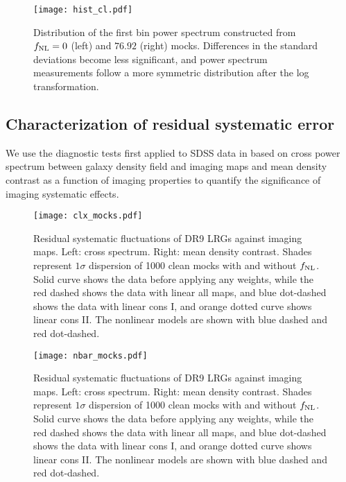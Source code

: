 \begin{figure}
\centering
\texttt{[image: hist\_cl.pdf]}
\caption{Distribution of the first bin power spectrum constructed from $f_{\rm NL}=0$ (left) and $76.92$ (right) mocks. Differences in the standard deviations become less significant, and power spectrum measurements follow a more symmetric distribution after the log transformation.}\label{fig:histcell}
\end{figure}


\subsection{Characterization of residual systematic error}
\label{ssec:characterization}
We use the diagnostic tests first applied to SDSS data in \cite{rezaie2021primordial} based on cross power spectrum between galaxy density field and imaging maps and mean density contrast as a function of imaging properties to quantify the significance of imaging systematic effects. 
\begin{figure*}
\centering
\texttt{[image: clx\_mocks.pdf]}
\caption{Residual systematic fluctuations of DR9 LRGs against imaging maps. Left: cross spectrum. Right: mean density contrast. Shades represent $1\sigma$ dispersion of 1000 clean mocks with and without $f_{\rm NL}$. Solid curve shows the data before applying any weights, while the red dashed shows the data with linear all maps, and blue dot-dashed shows the data with linear cons I, and orange dotted curve shows linear cons II. The nonlinear models are shown with blue dashed and red dot-dashed.}\label{fig:clxmock}
\end{figure*}

\begin{figure*}
\centering
\texttt{[image: nbar\_mocks.pdf]}
\caption{Residual systematic fluctuations of DR9 LRGs against imaging maps. Left: cross spectrum. Right: mean density contrast. Shades represent $1\sigma$ dispersion of 1000 clean mocks with and without $f_{\rm NL}$. Solid curve shows the data before applying any weights, while the red dashed shows the data with linear all maps, and blue dot-dashed shows the data with linear cons I, and orange dotted curve shows linear cons II. The nonlinear models are shown with blue dashed and red dot-dashed.}\label{fig:clxmock}
\end{figure*}



